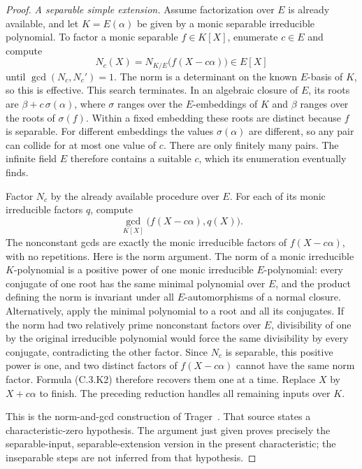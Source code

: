 \begin{proof}
\emph{A separable simple extension.}
Assume factorization over $E$ is already available, and let
$K=E(\alpha)$ be given by a monic separable irreducible
polynomial. To factor a monic separable $f\in K[X]$,
enumerate $c\in E$ and compute
\[
 N_c(X)=N_{K/E}\bigl(f(X-c\alpha)\bigr)\in E[X]
\]
until $\gcd(N_c,N_c')=1$.
The norm is a determinant on the known $E$-basis of $K$,
so this is effective.
This search terminates. In an algebraic closure of $E$,
its roots are $\beta+c\,\sigma(\alpha)$, where $\sigma$
ranges over the $E$-embeddings of $K$ and $\beta$ ranges
over the roots of $\sigma(f)$. Within a fixed embedding
these roots are distinct because $f$ is separable.
For different embeddings the values $\sigma(\alpha)$
are different, so any pair can collide for at most one
value of $c$. There are only finitely many pairs.
The infinite field $E$ therefore contains a suitable $c$,
which its enumeration eventually finds.

Factor $N_c$ by the already available procedure over $E$.
For each of its monic irreducible factors $q$, compute
\[
        \gcd_{K[X]}\bigl(f(X-c\alpha),q(X)\bigr).       \tag{C.3.K2}
\]
The nonconstant gcds are exactly the monic irreducible
factors of $f(X-c\alpha)$, with no repetitions.
Here is the norm argument. The norm of a monic irreducible
$K$-polynomial is a positive power of one monic irreducible
$E$-polynomial: every conjugate of one root has the same
minimal polynomial over $E$, and the product defining the
norm is invariant under all $E$-automorphisms of a normal
closure. Alternatively, apply the minimal polynomial to
a root and all its conjugates.
If the norm had two relatively prime nonconstant factors
over $E$, divisibility of one by the original irreducible
polynomial would force the same divisibility by every
conjugate, contradicting the other factor.
Since $N_c$ is separable, this positive power is one, and
two distinct factors of $f(X-c\alpha)$ cannot have the
same norm factor. Formula (C.3.K2) therefore recovers them
one at a time. Replace $X$ by $X+c\alpha$ to finish.
The preceding reduction handles all remaining inputs over $K$.

This is the norm-and-gcd construction of
Trager~\cite[Section 2, Theorems 2.1--2.3 and Corollary 2.5,
pp.\ 219--221]{C-TragerFunctionFields1976}.
That source states a characteristic-zero hypothesis.
The argument just given proves precisely the separable-input,
separable-extension version in the present characteristic;
the inseparable steps are not inferred from that hypothesis.


\end{proof}
